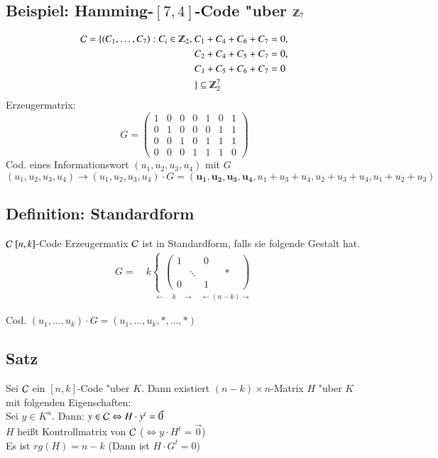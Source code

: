 \subsection{Beispiel: Hamming-$[7,4]$-Code "uber $\Z_7$}

\begin{align*}
\Code = \lbrace (C_1,\ldots,C_7) : C_i \in \Z_2,\ &C_1 + C_4 + C_6 + C_7 = 0,\\
										&C_2 + C_4 + C_5 + C_7 = 0,\\
										&C_3 + C_5 + C_6 + C_7 = 0\\
										 &\rbrace \subseteq \Z_2^7
\end{align*}
\noindent
Erzeugermatrix:
\[	G=
	\begin{pmatrix}
		1 & 0 & 0 & 0 & 1 & 0 & 1\\
		0 & 1 & 0 & 0 & 0 & 1 & 1\\
		0 & 0 & 1 & 0 & 1 & 1 & 1\\
		0 & 0 & 0 & 1 & 1 & 1 & 0
	\end{pmatrix}
\]
Cod. eines Informationswort $(u_1,u_2,u_3,u_4)$ mit $G$
\[
	(u_1,u_2,u_3,u_4) \rightarrow (u_1,u_2,u_3,u_4) \cdot G =  (\mathbf{u_1,u_2,u_3,u_4},u_1+u_3+u_4,u_2+u_3+u_4,u_1+u_2+u_3)
\]
\subsection{Definition: Standardform}
$\mathcal{C} \  [n,k]$-Code Erzeugermatix $\mathcal{C}$ ist in Standardform, falls sie folgende Gestalt hat.
\begin{align*}
	G= \quad
	k
	\underset{\leftarrow \quad k \quad \rightarrow \quad \leftarrow (n-k) \rightarrow}{
	\begin{cases}
	\begin{pmatrix}
		1 & & 0\\
		 & \ddots & & & * & \\
		0 & & 1 & &
	\end{pmatrix}
	\end{cases}
	}
\end{align*}

Cod. $(u_1,\ldots,u_k) \cdot G = (u_1,\ldots,u_k,*,\ldots,*)$

\subsection{Satz}
Sei $\mathcal{C}$ ein $[n,k]$-Code "uber $K$. Dann existiert $(n-k)\times n$-Matrix $H$ "uber $K$ mit folgenden Eigenschaften: \\
Sei $y\in K^n$. Dann: $y \in \mathcal{C} \Leftrightarrow H \cdot y^t = \vec{0}$ 
\\
$H$ hei\ss t Kontrollmatrix von $\mathcal{C}$ ($\Leftrightarrow y \cdot H^t = \vec{0}$) \\
Es ist $rg(H)=n-k$ (Dann ist $H \cdot G^t=0$)

